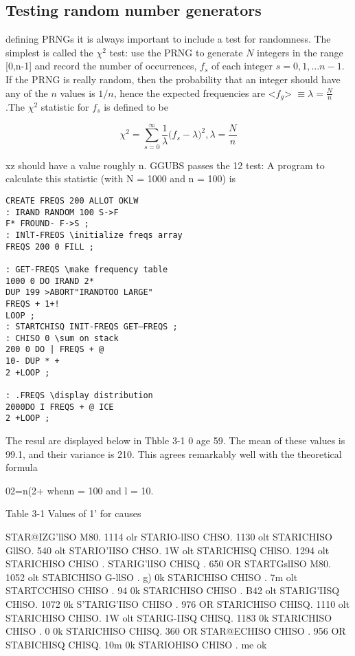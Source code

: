 
\subsection{Testing random number generators}
 defining PRNGs it is always important to include a test
for randomness. The simplest is called the $\chi^2$ test: use the
PRNG to generate $N$ integers in the range [0,n-1] and record
the number of occurrences, $f_s$ of each integer $s = 0, 1, \dots n-1$. If
the PRNG is really random, then the probability that an integer
should have any of the $n$ values is $1/n$, hence the expected 
frequencies are <$f_g$> $\equiv \lambda = \frac{N}{n}$ .The $\chi^2$ statistic for $f_s$ is defined to
be

\begin{equation}
\chi^2=\sum_{s=0}^{\infty}\frac{1}{\lambda}\Big(f_s-\lambda\Big)^2, \lambda=\frac{N}{n} %
\end{equation}


xz should have a value roughly n. GGUBS passes the 12 test: A
program to calculate this statistic (with N = 1000 and n = 100) is

\begin{verbatim}
CREATE FREQS 200 ALLOT OKLW
: IRAND RANDOM 100 S->F
F* FROUND- F->S ;
: INlT-FREOS \initialize freqs array
FREQS 200 0 FILL ;

: GET-FREQS \make frequency table
1000 0 DO IRAND 2*
DUP 199 >ABORT"IRANDTOO LARGE"
FREQS + 1+!
LOOP ;
: STARTCHISQ INIT-FREQS GET—FREQS ;
: CHISO 0 \sum on stack
200 0 DO | FREQS + @
10- DUP * +
2 +LOOP ;

: .FREQS \display distribution
2000DO I FREQS + @ ICE
2 +LOOP ;

\end{verbatim}
 


The resul are displayed below in Thble 3-1 0 age 59. The mean
of these values is 99.1, and their variance is 210. This agrees
remarkably well with the theoretical formula

02=n(2+%
whenn = 100 and l = 10.

Table 3-1 Values of 1' for causes

 

STAR@IZG'llSO M80. 1114 olr STARIO-lISO CHSO. 1130 olt
STARICHISO GllSO. 540 olt STARIO'IISO CHSO. 1W olt
STARICHISQ CHlSO. 1294 olt STARICHISO CHISO . %
STARIG'lISO CHISQ . 650 OR STARTGslISO M80. 1052 olt
STABICHISO G-llSO . g) 0k STARICHISO CHISO . 7m olt
STARTCCHISO CHISO . 94 0k STARICHISO CHISO . B42 olt
STARIG'IISQ CHlSO. 1072 0k S'TARIG'IISO CHISO . 976 OR
STARICHISO CHISQ. 1110 olt STARICHISO CHISO. 1W olt
STARIG-IISQ CHISQ. 1183 0k STARICHISO CHISO . $0$ 0k
STARICHISO CHISQ. 360 OR STAR@ECHISO CHISO . 956 OR
STABICHISQ CHISQ. 10m 0k STARIOHISO CHISO . me ok

